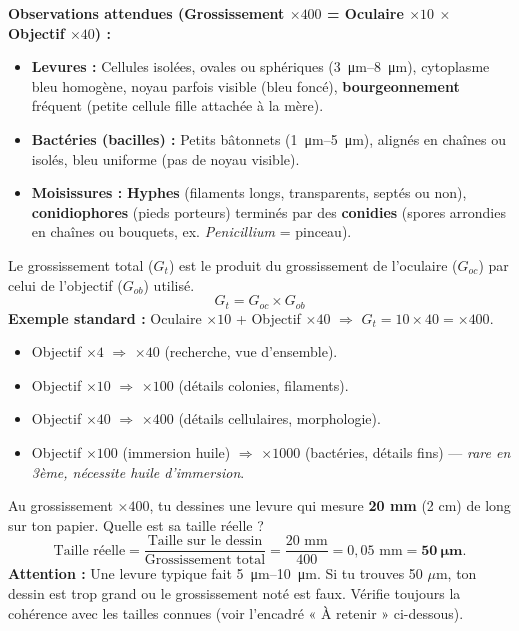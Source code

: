 \documentclass[11pt]{article}
\begin{document}
\begin{experience}
\textbf{Observations attendues (Grossissement $\times 400$ = Oculaire $\times 10$ $\times$ Objectif $\times 40$) :}
\begin{itemize}
    \item \textbf{Levures :} Cellules isolées, ovales ou sphériques (\SIrange{3}{8}{\micro\meter}), cytoplasme bleu homogène, noyau parfois visible (bleu foncé), \textbf{bourgeonnement} fréquent (petite cellule fille attachée à la mère).
    \item \textbf{Bactéries (bacilles) :} Petits bâtonnets (\SIrange{1}{5}{\micro\meter}), alignés en chaînes ou isolés, bleu uniforme (pas de noyau visible).
    \item \textbf{Moisissures :} \textbf{Hyphes} (filaments longs, transparents, septés ou non), \textbf{conidiophores} (pieds porteurs) terminés par des \textbf{conidies} (spores arrondies en chaînes ou bouquets, ex. \emph{Penicillium} = pinceau).
\end{itemize}
\end{experience}

\begin{methode}
Le grossissement total ($G_t$) est le produit du grossissement de l'oculaire ($G_{oc}$) par celui de l'objectif ($G_{ob}$) utilisé.
\[
G_t = G_{oc} \times G_{ob}
\]
\textbf{Exemple standard :} Oculaire $\times 10$ + Objectif $\times 40$ $\Rightarrow$ $G_t = 10 \times 40 = \textbf{$\times 400$}$.
\begin{itemize}
    \item Objectif $\times 4$ $\Rightarrow$ $\times 40$ (recherche, vue d'ensemble).
    \item Objectif $\times 10$ $\Rightarrow$ $\times 100$ (détails colonies, filaments).
    \item Objectif $\times 40$ $\Rightarrow$ $\times 400$ (détails cellulaires, morphologie).
    \item Objectif $\times 100$ (immersion huile) $\Rightarrow$ $\times 1000$ (bactéries, détails fins) — \emph{rare en 3ème, nécessite huile d'immersion}.
\end{itemize}
\end{methode}

\begin{exemplebox}
Au grossissement $\times 400$, tu dessines une levure qui mesure \textbf{20 mm} (2 cm) de long sur ton papier. Quelle est sa taille réelle ?
\[
\text{Taille réelle} = \frac{\text{Taille sur le dessin}}{\text{Grossissement total}} = \frac{20 \text{ mm}}{400} = 0,05 \text{ mm} = \mathbf{50\ \mu\text{m}}.
\]
\textbf{Attention :} Une levure typique fait \SIrange{5}{10}{\micro\meter}. Si tu trouves 50 $\mu$m, ton dessin est trop grand ou le grossissement noté est faux. Vérifie toujours la cohérence avec les tailles connues (voir l'encadré « À retenir » ci-dessous).
\end{exemplebox}
\end{document}
